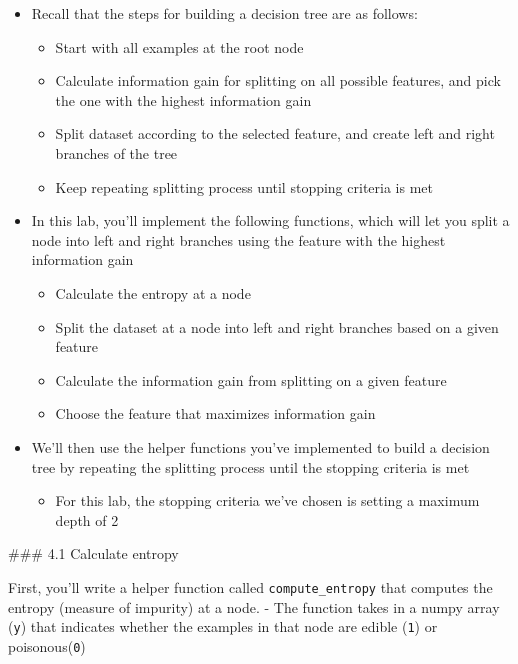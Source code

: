 \documentclass[11pt]{article}
\providecommand{\tightlist}{%
      \setlength{\itemsep}{0pt}\setlength{\parskip}{0pt}}
\begin{document}
\begin{itemize}
\tightlist
\item
  Recall that the steps for building a decision tree are as follows:

  \begin{itemize}
  \tightlist
  \item
    Start with all examples at the root node
  \item
    Calculate information gain for splitting on all possible features,
    and pick the one with the highest information gain
  \item
    Split dataset according to the selected feature, and create left and
    right branches of the tree
  \item
    Keep repeating splitting process until stopping criteria is met
  \end{itemize}
\item
  In this lab, you'll implement the following functions, which will let
  you split a node into left and right branches using the feature with
  the highest information gain

  \begin{itemize}
  \tightlist
  \item
    Calculate the entropy at a node
  \item
    Split the dataset at a node into left and right branches based on a
    given feature
  \item
    Calculate the information gain from splitting on a given feature
  \item
    Choose the feature that maximizes information gain
  \end{itemize}
\item
  We'll then use the helper functions you've implemented to build a
  decision tree by repeating the splitting process until the stopping
  criteria is met

  \begin{itemize}
  \tightlist
  \item
    For this lab, the stopping criteria we've chosen is setting a
    maximum depth of 2
  \end{itemize}
\end{itemize}

    \#\#\# 4.1 Calculate entropy

First, you'll write a helper function called \texttt{compute\_entropy}
that computes the entropy (measure of impurity) at a node. - The
function takes in a numpy array (\texttt{y}) that indicates whether the
examples in that node are edible (\texttt{1}) or poisonous(\texttt{0})
\end{document}
